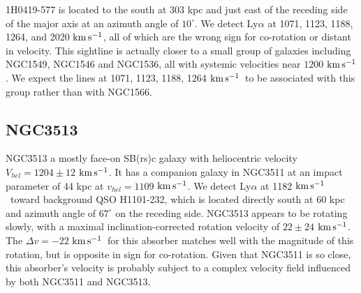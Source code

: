 \documentclass[iop]{emulateapj-rtx4}
\newcommand{\kms}{$\rm km\, s^{-1}$}
\begin{document}
1H0419-577 is located to the south at 303 kpc and just east of the receding side of the major axis at an azimuth angle of $10^{\circ}$. We detect Ly$\alpha$ at 1071, 1123, 1188, 1264, and 2020 \kms, all of which are the wrong sign for co-rotation or distant in velocity. This sightline is actually closer to a small group of galaxies including NGC1549, NGC1546 and NGC1536, all with systemic velocities near $1200$ \kms. We expect the lines at 1071, 1123, 1188, 1264 \kms~to be associated with this group rather than with NGC1566.


%
%
%
%
%



\subsection{NGC3513}
NGC3513 a mostly face-on SB(rs)c galaxy with heliocentric velocity $V_{hel} = 1204 \pm 12$ \kms. It has a companion galaxy in NGC3511 at an impact parameter of 44 kpc at $v_{hel} = 1109$ \kms. We detect Ly$\alpha$ at 1182 \kms~toward background QSO H1101-232, which is located directly south at 60 kpc and azimuth angle of $67^{\circ}$ on the receding side. NGC3513 appears to be rotating slowly, with a maximal inclination-corrected rotation velocity of $22 \pm 24$ \kms. The $\Delta v = -22$ \kms~for this absorber matches well with the magnitude of this rotation, but is opposite in sign for co-rotation. Given that NGC3511 is so close, this absorber's velocity is probably subject to a complex velocity field influenced by both NGC3511 and NGC3513.
\end{document}
